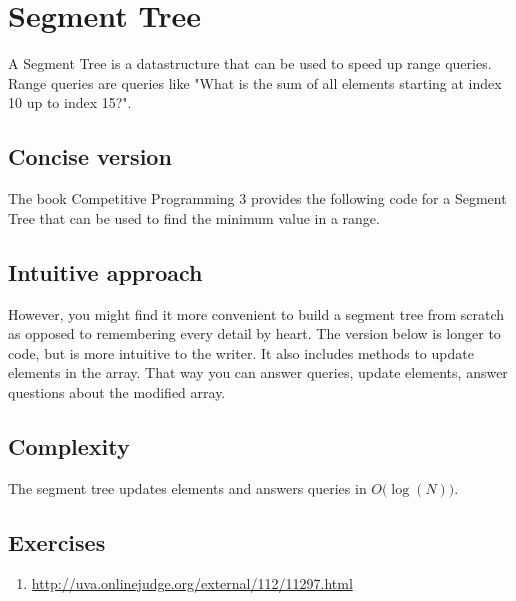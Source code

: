 \section{Segment Tree}
A Segment Tree is a datastructure that can be used to speed up range queries. Range queries are queries like "What is the sum of all elements starting at index 10 up to index 15?".

\subsection{Concise version}
The book Competitive Programming 3 provides the following code for a Segment Tree that can be used to find the minimum value in a range.



\subsection{Intuitive approach}
However, you might find it more convenient to build a segment tree from scratch as opposed to remembering every detail by heart. The version below is longer to code, but is more intuitive to the writer. It also includes methods to update elements in the array. That way you can answer queries, update elements, answer questions about the modified array.



\subsection{Complexity}
The segment tree updates elements and answers queries in $O(\log{\left(N\right))}$.

\subsection{Exercises}
\begin{enumerate}
\item \url{http://uva.onlinejudge.org/external/112/11297.html}

\end{enumerate}